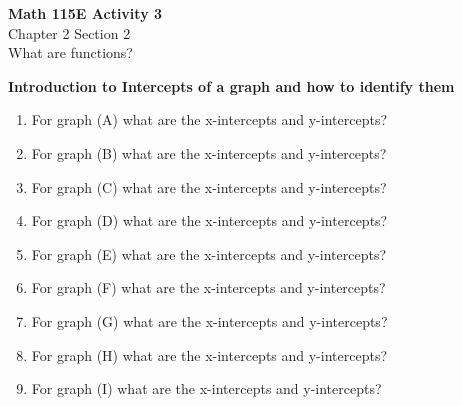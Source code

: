 \documentclass{article}
\begin{document}
\begin{center}
    \Large \textbf{Math 115E Activity 3} \\
    \vspace{0.2cm}
    \normalsize Chapter 2 Section 2 \\
    \normalsize What are functions?
\end{center}
\textbf{Introduction to Intercepts of a graph and how to identify them}

\vspace{1cm} %
\noindent
\begin{minipage}[c]{0.45\textwidth}
    \begin{enumerate}
        
        \item For graph (A) what are the x-intercepts and y-intercepts?
        \vspace{1cm}
        \item For graph (B) what are the x-intercepts and y-intercepts?
        \vspace{1cm}
        \item For graph (C) what are the x-intercepts and y-intercepts?     
        \vspace{1cm}
        \item For graph (D) what are the x-intercepts and y-intercepts?
        \vspace{1cm}
        \item For graph (E) what are the x-intercepts and y-intercepts?
        \vspace{1cm}
        \item For graph (F) what are the x-intercepts and y-intercepts?
        \vspace{1cm}
        \item For graph (G) what are the x-intercepts and y-intercepts?
        \vspace{1cm}
        \item For graph (H) what are the x-intercepts and y-intercepts?
        \vspace{1cm}
        \item For graph (I) what are the x-intercepts and y-intercepts?

    \end{enumerate}
\end{minipage}%
\hfill
\end{document}
